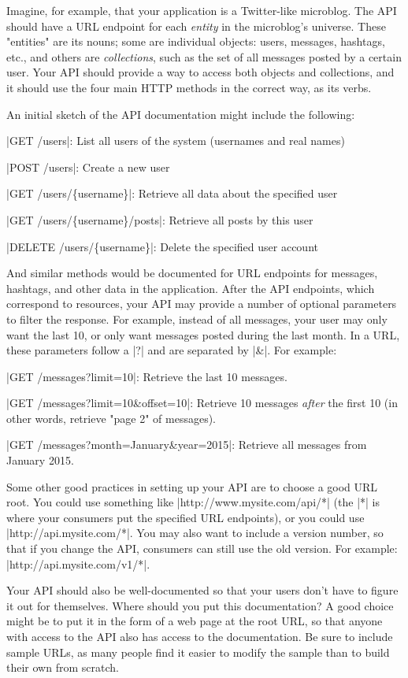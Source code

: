 \documentclass[11pt]{book}
\newcommand{\term}[1]{\emph{#1}} %
\begin{document}
Imagine, for example, that your application is a Twitter-like microblog.  The API should have a URL endpoint for each \term{entity} in the microblog's universe.  These "entities" are its nouns; some are individual objects: users, messages, hashtags, etc., and others are \term{collections}, such as the set of all messages posted by a certain user.  Your API should provide a way to access both objects and collections, and it should use the four main HTTP methods in the correct way, as its verbs.

An initial sketch of the API documentation might include the following:

|GET /users|: List all users of the system (usernames and real names)

|POST /users|: Create a new user

|GET /users/\{username\}|: Retrieve all data about the specified user

|GET /users/\{username\}/posts|: Retrieve all posts by this user

|DELETE /users/\{username\}|: Delete the specified user account

And similar methods would be documented for URL endpoints for messages, hashtags, and other data in the application.  After the API endpoints, which correspond to resources, your API may provide a number of optional parameters to filter the response.  For example, instead of all messages, your user may only want the last 10, or only want messages posted during the last month.  In a URL, these parameters follow a |?| and are separated by |&|.  For example:

|GET /messages?limit=10|: Retrieve the last 10 messages.

|GET /messages?limit=10\&offset=10|: Retrieve 10 messages \emph{after} the first 10 (in other words, retrieve "page 2" of messages).

|GET /messages?month=January\&year=2015|: Retrieve all messages from January 2015.

Some other good practices in setting up your API are to choose a good URL root.  You could use something like |http://www.mysite.com/api/*| (the |*| is where your consumers put the  specified URL endpoints), or you could use |http://api.mysite.com/*|.  You may also want to include a version number, so that if you change the API, consumers can still use the old version.  For example: |http://api.mysite.com/v1/*|.

Your API should also be well-documented so that your users don't have to figure it out for themselves.  Where should you put this documentation?  A good choice might be to put it in the form of a web page at the root URL, so that anyone with access to the API also has access to the documentation.  Be sure to include sample URLs, as many people find it easier to modify the sample than to build their own from scratch.
\end{document}
